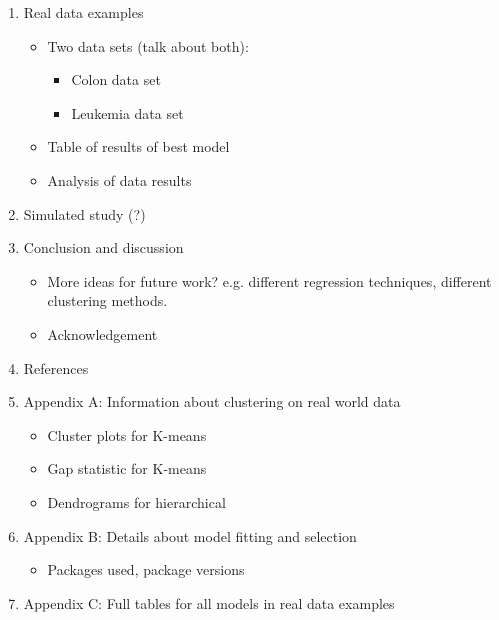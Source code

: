 \documentclass[11pt]{article}
\begin{document}
\begin{enumerate}
    \item Real data examples
    \begin{itemize}
        \item Two data sets (talk about both):
        \begin{itemize}
            \item Colon data set
            \item Leukemia data set
        \end{itemize}
        \item Table of results of best model
        \item Analysis of data results
    \end{itemize}
    \item Simulated study (?)
    \item Conclusion and discussion
    \begin{itemize}
        \item More ideas for future work? e.g. different regression techniques, different clustering methods.
        \item Acknowledgement
    \end{itemize}
    \item References
    \item Appendix A: Information about clustering on real world data
    \begin{itemize}
        \item Cluster plots for K-means
        \item Gap statistic for K-means
        \item Dendrograms for hierarchical
    \end{itemize}
    \item Appendix B: Details about model fitting and selection
    \begin{itemize}
        \item Packages used, package versions
    \end{itemize}
    \item Appendix C: Full tables for all models in real data examples
\end{enumerate}
\end{document}
